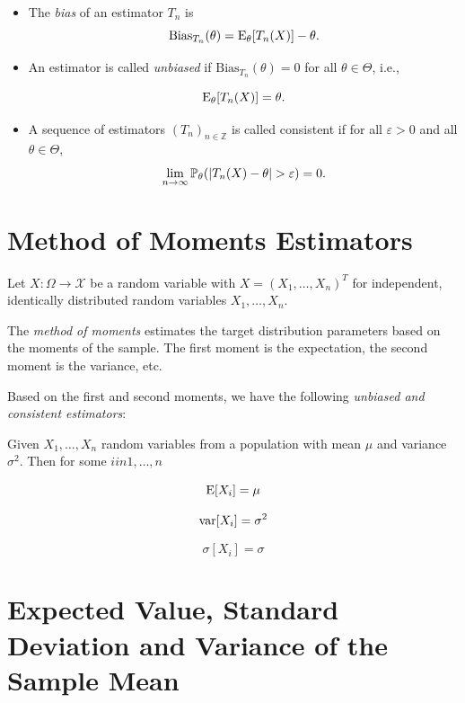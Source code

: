 \begin{itemize}

    \item The \emph{bias} of an estimator \(T_{n}\) is
    \[
        \mathrm{Bias}_{T_{n}}(\theta)
        = \mathrm{E}_{\theta}[T_{n}(X)] - \theta.
    \]

    \item An estimator is called \emph{unbiased} if
    \(\mathrm{Bias}_{T_{n}}(\theta) = 0\) for all \(\theta \in \Theta\), i.e.,

    \[
        \mathrm{E}_{\theta}[T_{n}(X)] = \theta.
    \]

    \item A sequence of estimators \((T_{n})_{n \in \mathbb{Z}}\) is called consistent if
    for all \(\varepsilon > 0\) and all \(\theta \in \Theta\),
    \[
        \lim_{n \to \infty} 
        \mathbb{P}_{\theta}\!\left( |T_{n}(X) - \theta| > \varepsilon \right)
        = 0.
    \]

\end{itemize}

\section{Method of Moments Estimators}

Let \(X : \Omega \to \mathcal{X}\) be a random variable with \(X = (X_{1}, \ldots, X_{n})^{T}\) for independent, identically distributed
random variables \(X_{1}, \ldots, X_{n}\).

The \emph{method of moments} estimates the target distribution parameters based on the 
moments of the sample. The first moment is the expectation, the second moment is the variance, etc.

Based on the first and second moments, we have the following \emph{unbiased and consistent estimators}:

Given \(X_1, \ldots, X_n\) random variables from a population with mean \(\mu\) and variance \(\sigma^2\). 
Then for some \(i in 1, \dots, n\)

\[
    \mathrm{E}[X_i] = \mu
\]

\[
    \mathrm{var}[X_i] = \sigma^2
\]

\[
    \sigma[X_i] = \sigma
\]

\section{Expected Value, Standard Deviation and Variance of the Sample Mean}

